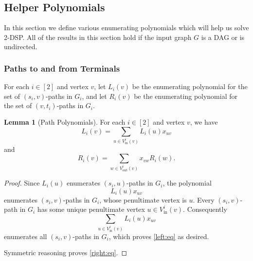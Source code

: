\documentclass[11pt]{article}
\DeclareMathOperator{\disj}{disj}
\renewcommand{\t}{\text}
\newcommand{\vin}{V_{\t{in}}}
\newcommand{\vout}{V_{\t{out}}}
\theoremstyle{definition}
\newtheorem{lemma}[theorem]{Lemma}
\begin{document}


    


\subsection{Helper Polynomials}
\label{subsec:helpers}

In this section we define various enumerating polynomials which will help us solve \textsf{2-DSP}.
All of the results in this section hold if the input graph $G$ is a DAG or is undirected.

\subsubsection*{Paths to and from Terminals}

For each $i\in [2]$ and vertex $v$, 
let $L_i(v)$ be the enumerating polynomial for the set of $(s_i,v)$-paths in $G_i$, and let $R_i(v)$ be the enumerating polynomial for the set of $(v,t_i)$-paths in $G_i$.
\begin{lemma}[Path Polynomials]
    \label{lem:dp}
    For each $i\in [2]$ and vertex $v$, we have 
        \begin{equation}
        \label{left:eq}
        L_i(v) = \sum_{u\in \vin^{i}(v)} L_i(u)x_{uv} 
        \end{equation}
    and
        \begin{equation}
        \label{right:eq}
        R_i(v) = \sum_{w\in\vout^i(v)} x_{vw}R_i(w).
        \end{equation}
\end{lemma}
\begin{proof}
    Since $L_i(u)$ enumerates $(s_i,u)$-paths in $G_i$, the polynomial
        \[L_i(u)x_{uv}\]
    enumerates $(s_i,v)$-paths in $G_i$, whose penultimate vertex is $u$.
    Every $(s_i,v)$-path in $G_i$ has some unique penultimate vertex $u\in \vin^i(v)$.
    Consequently
    \[\sum_{u\in \vin^{i}(v)} L_i(u)x_{uv} \]
    enumerates all $(s_i,v)$-paths in $G_i$, which proves \cref{left:eq} as desired.
    
    Symmetric reasoning proves \cref{right:eq}.
\end{proof}
\end{document}
